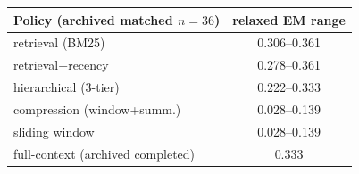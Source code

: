 \begin{tabular}{lc}
\toprule
Policy (archived matched $n{=}36$) & relaxed EM range\\
\midrule
retrieval (BM25) & 0.306--0.361 \\
retrieval+recency & 0.278--0.361 \\
hierarchical (3-tier) & 0.222--0.333 \\
compression (window+summ.) & 0.028--0.139 \\
sliding window & 0.028--0.139 \\
\midrule
full-context (archived completed) & 0.333 \\
\bottomrule
\end{tabular}